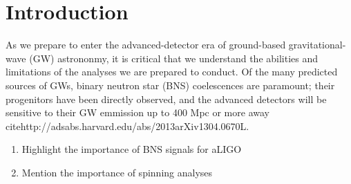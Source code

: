 \section{Introduction}

As we prepare to enter the advanced-detector era of ground-based gravitational-wave (GW) astrononmy, it is critical that we understand the abilities and limitations of the analyses we are prepared to conduct.  Of the many predicted sources of GWs, binary neutron star (BNS) coelescences are paramount; their progenitors have been directly observed, and the advanced detectors will be sensitive to their GW emmission up to 400 Mpc or more away \\cite{http://adsabs.harvard.edu/abs/2013arXiv1304.0670L}.


\begin{enumerate}
\item Highlight the importance of BNS signals for aLIGO
\item Mention the importance of spinning analyses
\end{enumerate}